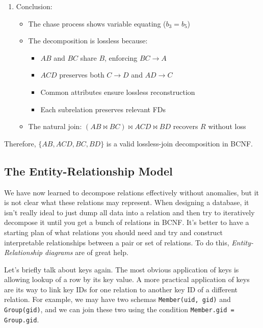 \documentclass{article}
\begin{document}
\begin{example}
\begin{enumerate}
      \item Conclusion:
          \begin{itemize}
          \item The chase process shows variable equating ($b_3 = b_5$)
          \item The decomposition is lossless because:
              \begin{itemize}
              \item $AB$ and $BC$ share $B$, enforcing $BC \rightarrow A$
              \item $ACD$ preserves both $C \rightarrow D$ and $AD \rightarrow C$
              \item Common attributes ensure lossless reconstruction
              \item Each subrelation preserves relevant FDs
              \end{itemize}
          \item The natural join: $(AB \bowtie BC) \bowtie ACD \bowtie BD$ recovers $R$ without loss
          \end{itemize}
      \end{enumerate}

      Therefore, $\{AB, ACD, BC, BD\}$ is a valid lossless-join decomposition in BCNF.
    \end{example}

  \subsection{The Entity-Relationship Model} 

      We have now learned to decompose relations effectively without anomalies, but it is not clear what these relations may represent. When designing a database, it isn't really ideal to just dump all data into a relation and then try to iteratively decompose it until you get a bunch of relations in BCNF. It's better to have a starting plan of what relations you should need and try and construct interpretable relationships between a pair or set of relations. To do this, \textit{Entity-Relationship diagrams} are of great help. 

      Let's briefly talk about keys again. The most obvious application of keys is allowing lookup of a row by its key value. A more practical application of keys are its way to link key IDs for one relation to another key ID of a different relation. For example, we may have two schemas \texttt{Member(uid, gid)} and \texttt{Group(gid)}, and we can join these two using the condition \texttt{Member.gid = Group.gid}. 
\end{document}
